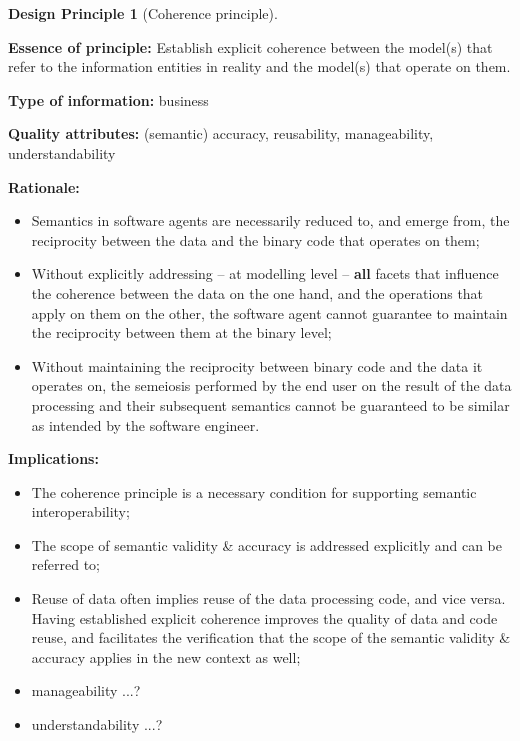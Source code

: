 \documentclass[a4paper,11pt,oneside,oldfontcommands]{memoir}
\theoremstyle{definition}
\theoremstyle{break}		%
\newtheorem{mmdp}{Design Principle}[chapter]
\numberwithin{equation}{chapter}
\numberwithin{figure}{chapter}
\begin{document}
\begin{mmdp}[Coherence principle]\label{dp:coherence-principle}

\textbf{Essence of principle:} Establish explicit coherence between the model(s) that refer to the information entities in reality and the model(s) that operate on them.

\textbf{Type of information:} business

\textbf{Quality attributes:} (semantic) accuracy, reusability, manageability, understandability 

\textbf{Rationale:}
\begin{itemize}
\item Semantics in software agents are necessarily reduced to, and emerge from, the reciprocity between the data and the binary code that operates on them;  
\item Without explicitly addressing -- at modelling level -- \textbf{all} facets that influence the coherence between the data on the one hand, and the operations that apply on them on the other, the software agent cannot guarantee to maintain the reciprocity between them at the binary level;
\item Without maintaining the reciprocity between binary code and the data it operates on, the semeiosis performed by the end user on the result of the data processing and their subsequent semantics cannot be guaranteed to be similar as intended by the software engineer.
\end{itemize}
\textbf{Implications:}
\begin{itemize}
\item The coherence principle is a necessary condition for supporting semantic interoperability;
\item The scope of semantic validity \& accuracy is addressed explicitly and can be referred to;
\item Reuse of data often implies reuse of the data processing code, and vice versa. Having established explicit coherence improves the quality of data and code reuse, and facilitates the verification that the scope of the semantic validity \& accuracy applies in the new context as well;
\item manageability ...?
\item understandability ...?
\end{itemize}  
\end{mmdp}
\end{document}
